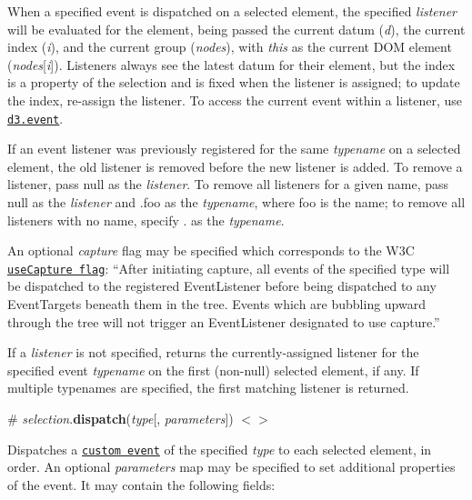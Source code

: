 When a specified event is dispatched on a selected element, the specified {\itshape listener} will be evaluated for the element, being passed the current datum ({\itshape d}), the current index ({\itshape i}), and the current group ({\itshape nodes}), with {\itshape this} as the current D\+OM element ({\itshape nodes}\mbox{[}{\itshape i}\mbox{]}). Listeners always see the latest datum for their element, but the index is a property of the selection and is fixed when the listener is assigned; to update the index, re-\/assign the listener. To access the current event within a listener, use \href{#event}{\tt d3.\+event}.

If an event listener was previously registered for the same {\itshape typename} on a selected element, the old listener is removed before the new listener is added. To remove a listener, pass null as the {\itshape listener}. To remove all listeners for a given name, pass null as the {\itshape listener} and {\ttfamily .foo} as the {\itshape typename}, where {\ttfamily foo} is the name; to remove all listeners with no name, specify {\ttfamily .} as the {\itshape typename}.

An optional {\itshape capture} flag may be specified which corresponds to the W3C \href{http://www.w3.org/TR/DOM-Level-2-Events/events.html#Events-registration}{\tt use\+Capture flag}\+: “\+After initiating capture, all events of the specified type will be dispatched to the registered Event\+Listener before being dispatched to any Event\+Targets beneath them in the tree. Events which are bubbling upward through the tree will not trigger an Event\+Listener designated to use capture.\+”

If a {\itshape listener} is not specified, returns the currently-\/assigned listener for the specified event {\itshape typename} on the first (non-\/null) selected element, if any. If multiple typenames are specified, the first matching listener is returned.

\label{_selection_dispatch}%
\# {\itshape selection}.{\bfseries dispatch}({\itshape type}\mbox{[}, {\itshape parameters}\mbox{]}) \href{https://github.com/d3/d3-selection/blob/master/src/selection/dispatch.js}{\tt $<$$>$}

Dispatches a \href{http://www.w3.org/TR/dom/#interface-customevent}{\tt custom event} of the specified {\itshape type} to each selected element, in order. An optional {\itshape parameters} map may be specified to set additional properties of the event. It may contain the following fields\+:


